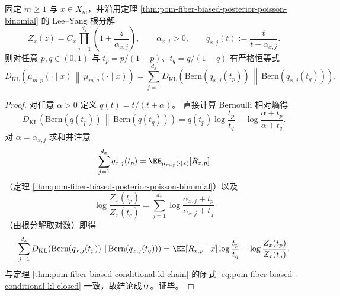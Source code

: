 \begin{theorem}\label{thm:pom-fiber-leyang-kl-bernoulli-decomposition}
固定 \(m\ge 1\) 与 \(x\in X_m\)，并沿用定理 \ref{thm:pom-fiber-biased-posterior-poisson-binomial} 的 Lee--Yang 根分解
\[
Z_x(z)=C_x\prod_{j=1}^{d_x}\left(1+\frac{z}{\alpha_{x,j}}\right),
\qquad
\alpha_{x,j}>0,
\qquad
q_{x,j}(t):=\frac{t}{t+\alpha_{x,j}}.
\]
则对任意 \(p,q\in(0,1)\) 与 \(t_p=p/(1-p)\)、\(t_q=q/(1-q)\) 有严格恒等式
\[
D_{\mathrm{KL}}\!\left(\mu_{m,p}(\cdot\mid x)\,\middle\|\,\mu_{m,q}(\cdot\mid x)\right)
=\sum_{j=1}^{d_x}
D_{\mathrm{KL}}\!\left(\mathrm{Bern}(q_{x,j}(t_p))\,\middle\|\,\mathrm{Bern}(q_{x,j}(t_q))\right).
\]
\end{theorem}
\begin{proof}
对任意 \(\alpha>0\) 定义 \(q(t)=t/(t+\alpha)\)。
直接计算 Bernoulli 相对熵得
\[
D_{\mathrm{KL}}\!\left(\mathrm{Bern}(q(t_p))\,\middle\|\,\mathrm{Bern}(q(t_q))\right)
=q(t_p)\log\frac{t_p}{t_q}-\log\frac{\alpha+t_p}{\alpha+t_q}.
\]
对 \(\alpha=\alpha_{x,j}\) 求和并注意
\[
\sum_{j=1}^{d_x}q_{x,j}(t_p)=\EE_{\mu_{m,p}(\cdot\mid x)}[R_{x,p}]
\]
（定理 \ref{thm:pom-fiber-biased-posterior-poisson-binomial}）以及
\[
\log\frac{Z_x(t_p)}{Z_x(t_q)}
=\sum_{j=1}^{d_x}\log\frac{\alpha_{x,j}+t_p}{\alpha_{x,j}+t_q}
\]
（由根分解取对数）即得
\[
\sum_{j=1}^{d_x}
D_{\mathrm{KL}}\!\left(\mathrm{Bern}(q_{x,j}(t_p))\,\middle\|\,\mathrm{Bern}(q_{x,j}(t_q))\right)
=\EE[R_{x,p}\mid x]\log\frac{t_p}{t_q}-\log\frac{Z_x(t_p)}{Z_x(t_q)}.
\]
与定理 \ref{thm:pom-fiber-biased-conditional-kl-chain} 的闭式 \eqref{eq:pom-fiber-biased-conditional-kl-closed} 一致，故结论成立。证毕。
\end{proof}

